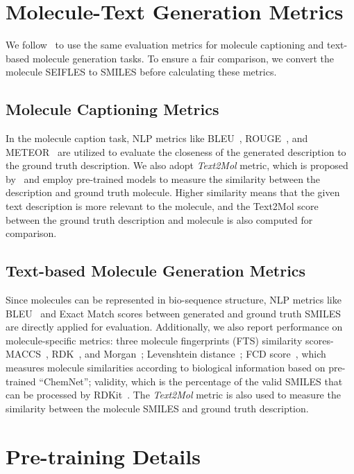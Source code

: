 \documentclass[11pt]{article}
\begin{document}
\section{Molecule-Text Generation Metrics}
\label{sec:mol_text_metric}
We follow~\citet{DBLP:conf/emnlp/EdwardsLRHCJ22} to use the same evaluation metrics for molecule captioning and text-based molecule generation tasks.
To ensure a fair comparison, we convert the molecule SEIFLES to SMILES before calculating these metrics.
\subsection{Molecule Captioning Metrics}
In the molecule caption task, NLP metrics like BLEU~\citep{DBLP:conf/acl/PapineniRWZ02}, ROUGE~\citep{lin2004rouge}, and METEOR~\citep{DBLP:conf/acl/BanerjeeL05} are utilized to evaluate the closeness of the generated description to the ground truth description.
We also adopt \textit{Text2Mol} metric, which is proposed by~\citet{DBLP:conf/emnlp/EdwardsZJ21} and employ pre-trained models to measure the similarity between the description and ground truth molecule.
Higher similarity means that the given text description is more relevant to the molecule, and the Text2Mol score between the ground truth description and molecule is also computed for comparison.

\subsection{Text-based Molecule Generation Metrics}
Since molecules can be represented in bio-sequence structure, NLP metrics like BLEU~\citep{DBLP:conf/acl/PapineniRWZ02} and Exact Match scores between generated and ground truth SMILES are directly applied for evaluation.
Additionally, we also report performance on molecule-specific metrics: three molecule fingerprints (FTS) similarity scores-MACCS~\citep{durant2002reoptimization}, RDK~\citep{DBLP:journals/jcisd/SchneiderSL15}, and Morgan~\citep{rogers2010extended};
Levenshtein distance~\citep{miller2009levenshtein}; 
FCD score~\citep{DBLP:journals/jcisd/PreuerRUHK18}, which measures molecule similarities according to biological information based on pre-trained ``ChemNet'';
validity, which is the percentage of the valid SMILES that can be processed by RDKit~\citep{Landrum2021RDKit2021_03_2}.
The \textit{Text2Mol} metric is also used to measure the similarity between the molecule SMILES and ground truth description.


\section{Pre-training Details}
\label{sec:pretrain_dataset}
\end{document}
